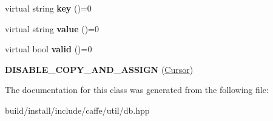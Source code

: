 \begin{DoxyCompactItemize}
\item 
\mbox{\label{classcaffe_1_1db_1_1_cursor_a87ec068564018e9218360db6fb1dade3}} 
virtual string {\bfseries key} ()=0
\item 
\mbox{\label{classcaffe_1_1db_1_1_cursor_ad6de2be246e7b46c00d34c29b24e16ee}} 
virtual string {\bfseries value} ()=0
\item 
\mbox{\label{classcaffe_1_1db_1_1_cursor_ae3811414ce9044a639195462be9e4f38}} 
virtual bool {\bfseries valid} ()=0
\item 
\mbox{\label{classcaffe_1_1db_1_1_cursor_acbd3ccf06a180bd19079a2fec0a6a8f2}} 
{\bfseries D\+I\+S\+A\+B\+L\+E\+\_\+\+C\+O\+P\+Y\+\_\+\+A\+N\+D\+\_\+\+A\+S\+S\+I\+GN} (\mbox{\hyperlink{classcaffe_1_1db_1_1_cursor}{Cursor}})
\end{DoxyCompactItemize}


The documentation for this class was generated from the following file\+:\begin{DoxyCompactItemize}
\item 
build/install/include/caffe/util/db.\+hpp\end{DoxyCompactItemize}
